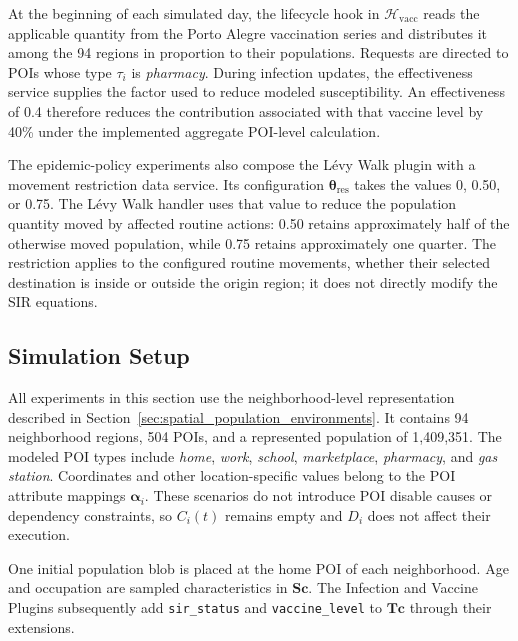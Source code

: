 At the beginning of each simulated day, the lifecycle hook in $\mathcal{H}_{\mathrm{vacc}}$ reads the applicable quantity from the Porto Alegre vaccination series and distributes it among the 94 regions in proportion to their populations. Requests are directed to POIs whose type $\tau_i$ is \textit{pharmacy}. During infection updates, the effectiveness service supplies the factor used to reduce modeled susceptibility. An effectiveness of 0.4 therefore reduces the contribution associated with that vaccine level by 40\% under the implemented aggregate POI-level calculation.

The epidemic-policy experiments also compose the L\'evy Walk plugin with a movement restriction data service. Its configuration $\bm{\theta}_{\mathrm{res}}$ takes the values 0, 0.50, or 0.75. The L\'evy Walk handler uses that value to reduce the population quantity moved by affected routine actions: 0.50 retains approximately half of the otherwise moved population, while 0.75 retains approximately one quarter. The restriction applies to the configured routine movements, whether their selected destination is inside or outside the origin region; it does not directly modify the SIR equations.



\subsection{Simulation Setup}
\label{sec:large_scale_epidemic_setup}


All experiments in this section use the neighborhood-level representation described in Section~\ref{sec:spatial_population_environments}. It contains 94 neighborhood regions, 504 POIs, and a represented population of 1,409,351. The modeled POI types include \textit{home}, \textit{work}, \textit{school}, \textit{marketplace}, \textit{pharmacy}, and \textit{gas station}. Coordinates and other location-specific values belong to the POI attribute mappings $\bm{\alpha}_i$. These scenarios do not introduce POI disable causes or dependency constraints, so $C_i(t)$ remains empty and $D_i$ does not affect their execution.

One initial population blob is placed at the home POI of each neighborhood. Age and occupation are sampled characteristics in $\bm{Sc}$. The Infection and Vaccine Plugins subsequently add \texttt{sir\_status} and \texttt{vaccine\_level} to $\bm{Tc}$ through their extensions. %

